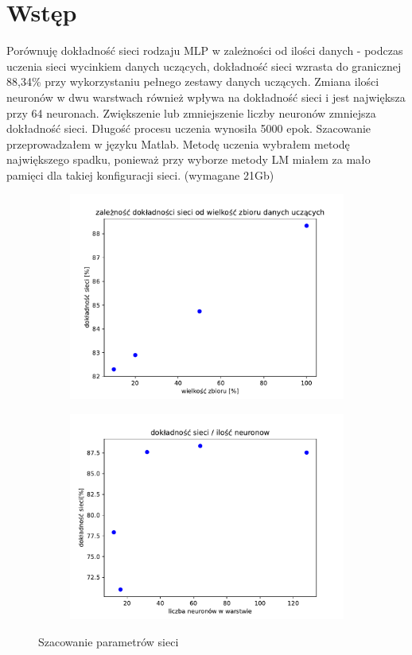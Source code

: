 \section{Wstęp}
Porównuję dokładność sieci rodzaju MLP w zależności od ilości danych - 
podczas uczenia sieci wycinkiem danych uczących, dokładność sieci wzrasta do granicznej 88,34\% przy wykorzystaniu pełnego zestawy danych uczących.
Zmiana ilości neuronów w dwu warstwach również wpływa na dokładność sieci i jest największa przy 64 neuronach. Zwiększenie lub zmniejszenie liczby neuronów zmniejsza dokładność sieci. Długość procesu uczenia wynosiła 5000 epok. Szacowanie przeprowadzałem w języku Matlab. Metodę uczenia wybrałem metodę największego spadku, ponieważ przy wyborze metody LM miałem za mało pamięci dla takiej konfiguracji sieci. (wymagane 21Gb)


\begin{figure}[h]
    \begin{subfigure}{.5\textwidth}
    	\centering 
            \includegraphics[width=0.90\linewidth]{gfx/fig03b.pdf} 
    \end{subfigure} %
    \begin{subfigure} {.5\textwidth}
    	\centering 
            \includegraphics[width=0.90\linewidth]{gfx/fig03a.pdf} 
    \end{subfigure} 
    \caption{Szacowanie parametrów sieci}
\end{figure} 

